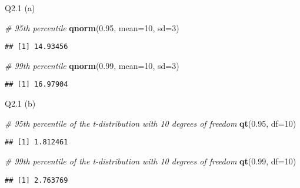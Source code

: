 \documentclass[
]{article}
\author{}
\date{\vspace{-2.5em}}
\newenvironment{Shaded}{\begin{snugshade}}{\end{snugshade}}
\newcommand{\AttributeTok}[1]{\textcolor[rgb]{0.13,0.29,0.53}{#1}}
\newcommand{\CommentTok}[1]{\textcolor[rgb]{0.56,0.35,0.01}{\textit{#1}}}
\newcommand{\DecValTok}[1]{\textcolor[rgb]{0.00,0.00,0.81}{#1}}
\newcommand{\FloatTok}[1]{\textcolor[rgb]{0.00,0.00,0.81}{#1}}
\newcommand{\FunctionTok}[1]{\textcolor[rgb]{0.13,0.29,0.53}{\textbf{#1}}}
\newcommand{\NormalTok}[1]{#1}
\begin{document}
Q2.1 (a)

\begin{Shaded}
\begin{Highlighting}[]
\CommentTok{\# 95th percentile}
\FunctionTok{qnorm}\NormalTok{(}\FloatTok{0.95}\NormalTok{, }\AttributeTok{mean=}\DecValTok{10}\NormalTok{, }\AttributeTok{sd=}\DecValTok{3}\NormalTok{)}
\end{Highlighting}
\end{Shaded}

\begin{verbatim}
## [1] 14.93456
\end{verbatim}

\begin{Shaded}
\begin{Highlighting}[]
\CommentTok{\# 99th percentile}
\FunctionTok{qnorm}\NormalTok{(}\FloatTok{0.99}\NormalTok{, }\AttributeTok{mean=}\DecValTok{10}\NormalTok{, }\AttributeTok{sd=}\DecValTok{3}\NormalTok{)}
\end{Highlighting}
\end{Shaded}

\begin{verbatim}
## [1] 16.97904
\end{verbatim}

Q2.1 (b)

\begin{Shaded}
\begin{Highlighting}[]
\CommentTok{\# 95th percentile of the t{-}distribution with 10 degrees of freedom}
\FunctionTok{qt}\NormalTok{(}\FloatTok{0.95}\NormalTok{, }\AttributeTok{df=}\DecValTok{10}\NormalTok{)}
\end{Highlighting}
\end{Shaded}

\begin{verbatim}
## [1] 1.812461
\end{verbatim}

\begin{Shaded}
\begin{Highlighting}[]
\CommentTok{\# 99th percentile of the t{-}distribution with 10 degrees of freedom}
\FunctionTok{qt}\NormalTok{(}\FloatTok{0.99}\NormalTok{, }\AttributeTok{df=}\DecValTok{10}\NormalTok{)}
\end{Highlighting}
\end{Shaded}

\begin{verbatim}
## [1] 2.763769
\end{verbatim}
\end{document}
